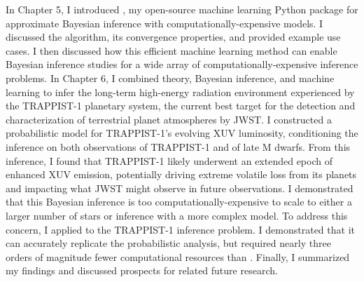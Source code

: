 In Chapter 5, I introduced \approxposterior, my open-source machine learning Python package for approximate Bayesian inference with computationally-expensive models. I discussed the algorithm, its convergence properties, and provided example use cases. I then discussed how this efficient machine learning method can enable Bayesian inference studies for a wide array of computationally-expensive inference problems. In Chapter 6, I combined theory, Bayesian inference, and machine learning to infer the long-term high-energy radiation environment experienced by the TRAPPIST-1 planetary system, the current best target for the detection and characterization of terrestrial planet atmospheres by JWST. I constructed a probabilistic model for TRAPPIST-1's evolving XUV luminosity, conditioning the inference on both observations of TRAPPIST-1 and of late M dwarfs. From this inference, I found that TRAPPIST-1 likely underwent an extended epoch of enhanced XUV emission, potentially driving extreme volatile loss from its planets and impacting what JWST might observe in future observations. I demonstrated that this Bayesian inference is too computationally-expensive to scale to either a larger number of stars or inference with a more complex model. To address this concern, I applied \approxposterior to the TRAPPIST-1 inference problem. I demonstrated that it can accurately replicate the probabilistic analysis, but required nearly three orders of magnitude fewer computational resources than \emcee.  Finally, I summarized my findings and discussed prospects for related future research.


